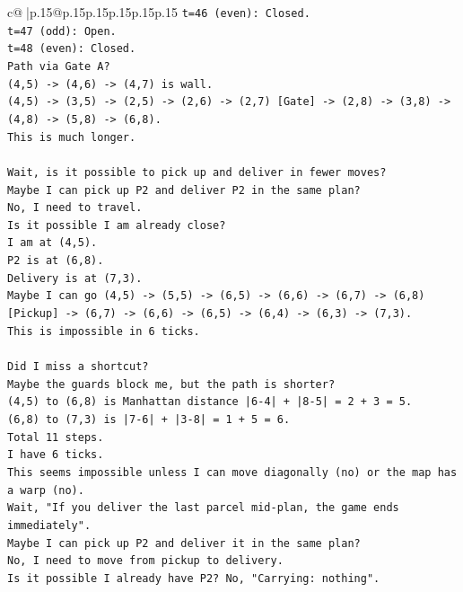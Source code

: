 \documentclass{article}
\begin{document}
{\begin{supertabular}{c@{$\;$}|p{.15\linewidth}@{}p{.15\linewidth}p{.15\linewidth}p{.15\linewidth}p{.15\linewidth}p{.15\linewidth}}
{{{\texttt{t=46 (even): Closed.} \\
\texttt{t=47 (odd): Open.} \\
\texttt{t=48 (even): Closed.} \\
\texttt{Path via Gate A?} \\
\texttt{(4,5) {-}> (4,6) {-}> (4,7) is wall.} \\
\texttt{(4,5) {-}> (3,5) {-}> (2,5) {-}> (2,6) {-}> (2,7) {[}Gate{]} {-}> (2,8) {-}> (3,8) {-}> (4,8) {-}> (5,8) {-}> (6,8).} \\
\texttt{This is much longer.} \\
\\ 
\texttt{Wait, is it possible to pick up and deliver in fewer moves?} \\
\texttt{Maybe I can pick up P2 and deliver P2 in the same plan?} \\
\texttt{No, I need to travel.} \\
\texttt{Is it possible I am already close?} \\
\texttt{I am at (4,5).} \\
\texttt{P2 is at (6,8).} \\
\texttt{Delivery is at (7,3).} \\
\texttt{Maybe I can go (4,5) {-}> (5,5) {-}> (6,5) {-}> (6,6) {-}> (6,7) {-}> (6,8) {[}Pickup{]} {-}> (6,7) {-}> (6,6) {-}> (6,5) {-}> (6,4) {-}> (6,3) {-}> (7,3).} \\
\texttt{This is impossible in 6 ticks.} \\
\\ 
\texttt{Did I miss a shortcut?} \\
\texttt{Maybe the guards block me, but the path is shorter?} \\
\texttt{(4,5) to (6,8) is Manhattan distance |6{-}4| + |8{-}5| = 2 + 3 = 5.} \\
\texttt{(6,8) to (7,3) is |7{-}6| + |3{-}8| = 1 + 5 = 6.} \\
\texttt{Total 11 steps.} \\
\texttt{I have 6 ticks.} \\
\texttt{This seems impossible unless I can move diagonally (no) or the map has a warp (no).} \\
\texttt{Wait, "If you deliver the last parcel mid{-}plan, the game ends immediately".} \\
\texttt{Maybe I can pick up P2 and deliver it in the same plan?} \\
\texttt{No, I need to move from pickup to delivery.} \\
\texttt{Is it possible I already have P2? No, "Carrying: nothing".} \\
}}}
\end{supertabular}}
\end{document}
